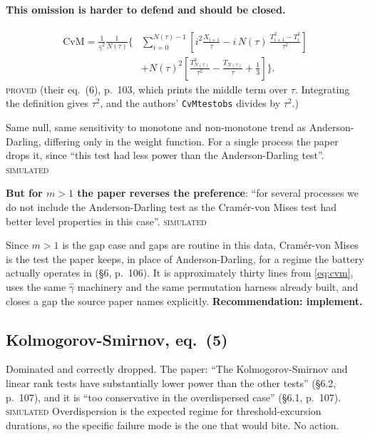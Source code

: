 \documentclass[11pt,a4paper]{article}
\newcommand{\gh}{\hat\gamma}
\newcommand{\Ntau}{N(\tau)}
\newcommand{\PROVED}{\textsc{\textcolor{blue!55!black}{proved}}}
\newcommand{\SIMULATED}{\textsc{\textcolor{orange!70!black}{simulated}}}
\begin{document}
\paragraph{This omission is harder to defend and should be closed.}
%
\begin{equation}
\begin{split}
\mathrm{CvM} = \frac{1}{\gh^2}\frac{1}{\Ntau}
\Biggl\{&\sum_{i=0}^{\Ntau-1}\left[i^2\frac{X_{i+1}}{\tau}
- i\,\Ntau\,\frac{T_{i+1}^2 - T_i^2}{\tau^2}\right]\\
&+ \Ntau^2\left[\frac{T_{\Ntau}^2}{\tau^2} - \frac{T_{\Ntau}}{\tau}
+ \frac{1}{3}\right]\Biggr\}.
\end{split}
\label{eq:cvm}
\end{equation}
\PROVED{} (their eq.~(6), p.~103, which prints the middle term over $\tau$. Integrating
the definition gives $\tau^2$, and the authors' \texttt{CvMtestobs} divides by $\tau^2$.)

Same null, same sensitivity to monotone and non-monotone trend as Anderson-Darling,
differing only in the weight function. For a single process the paper drops it, since
\enquote{this test had less power than the Anderson-Darling test}. \SIMULATED

\medskip
\noindent\textbf{But for $m > 1$ the paper reverses the preference}: \enquote{for
several processes we do not include the Anderson-Darling test as the Cramér-von Mises
test had better level properties in this case}. \SIMULATED

Since $m > 1$ is the gap case and gaps are routine in this data, Cramér-von Mises is the
test the paper keeps, in place of Anderson-Darling, for a regime the battery actually
operates in (\S 6, p.~106). It is
approximately thirty lines from \eqref{eq:cvm}, uses the same $\gh$ machinery and the
same permutation harness already built, and closes a gap the source paper names
explicitly. \textbf{Recommendation: implement.}

\subsection{Kolmogorov-Smirnov, eq.~(5)}

Dominated and correctly dropped. The paper: \enquote{The Kolmogorov-Smirnov and linear rank
tests have substantially lower power than the other tests} (\S 6.2, p.~107), and it is
\enquote{too conservative in the overdispersed case} (\S 6.1, p.~107). \SIMULATED{} Overdispersion is the expected regime for threshold-excursion
durations, so the specific failure mode is the one that would bite. No action.
\end{document}
